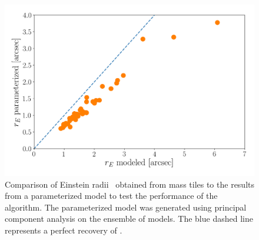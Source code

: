 \begin{figure}
  \includegraphics[width=\linewidth]{img/rE_comp/rE_comp.png}
  \caption{ Comparison of Einstein radii \ER\ obtained from mass tiles
    to the results from a parameterized model to test the performance
    of the algorithm.  The parameterized model was generated using
    principal component analysis on the ensemble of models.  The blue
    dashed line represents a perfect recovery of \ER.  }
  \label{fig:parameter}
\end{figure}




